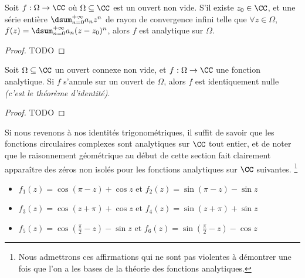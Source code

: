 

\begin{fact} \label{power-series-vs-analytic}
    Soit $f: \Omega \rightarrow \CC$ où $\Omega \subseteq \CC$ est un ouvert non vide.
    S'il existe
    $z_0 \in \CC$,
    et
    une série entière $\dsum_{n = 0}^{+\infty} a_n z^n$ de rayon de convergence infini
    telle que
	$\forall z \in \Omega$, $f(z) = \dsum_{n = 0}^{+\infty} a_n (z - z_0)^n$,
	alors
	$f$ est analytique sur $\Omega$. 
\end{fact}


\begin{proof}
	TODO
\end{proof}




\begin{fact} \label{analytic-identity}
    Soit $\Omega \subseteq \CC$ un ouvert connexe non vide,
    et
    $f: \Omega \rightarrow \CC$ une fonction analytique.
	Si $f$ s'annule sur un ouvert de $\Omega$, alors $f$ est identiquement nulle
	\emph{(c'est le théorème d'identité)}.  
\end{fact}


\begin{proof}
	TODO
\end{proof}




Si nous revenons à nos identités trigonométriques, il suffit de savoir que les fonctions circulaires complexes sont analytiques sur $\CC$ tout entier, et de noter que le raisonnement géométrique au début de cette section fait clairement apparaître des zéros non isolés pour les fonctions analytiques sur $\CC$ suivantes.%
\footnote{
	Nous admettrons ces affirmations qui ne sont pas violentes à démontrer une fois que l'on a les bases de la théorie des fonctions analytiques.
}
%
\begin{itemize}[label=\small\textbullet]
	\item $f_1(z) = \cos (\pi - z) + \cos z$ 
	   et $f_2(z) = \sin (\pi - z) - \sin z$ 

	\smallskip
	\item $f_3(z) =\cos (z + \pi) + \cos z$ 
	   et $f_4(z) =\sin (z + \pi) + \sin z$

	\smallskip
	\item $f_5(z) =\cos \left( \frac{\pi}{2} - z \right) - \sin z$ 
	   et $f_6(z) =\sin \left( \frac{\pi}{2} - z \right) - \cos z$ 
\end{itemize}








